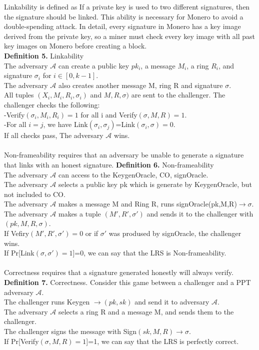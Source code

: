     
    Linkability is defined as If a private key is used to two different signatures, then the signature should be linked. This ability is necessary for Monero to avoid a double-spending attack. In detail, every signature in Monero has a key image derived from the private key, so a miner must check every key image with all past key images on Monero before creating a block.\\
    \textbf{Definition 5.} Linkability\\
    The adversary $\mathcal A $ can create a public key $pk_i$, a message $M_i$, a ring $R_i$, and signature $\sigma_i$ for $i \in [0,k-1]$.\\
    The adversary $\mathcal A $ also creates another message M, ring R and signature $\sigma $.\\
    All tuples $(X_i,M_i,R_i,\sigma_i)$ and $M,R,\sigma)$ are sent to the challenger.
    The challenger checks the following:\\
    -Verify$(\sigma_i,M_i,R_i)=1$ for all i and Verify$(\sigma,M,R)=1$.\\
    -For all $i=j$, we have Link$(\sigma_i,\sigma_j)$=Link$(\sigma_i,\sigma)=0$.\\
    If all checks pass, The adversary $\mathcal A $ wins.\\
    \\    
    Non-frameability requires that an adversary be unable to generate a signature that links with an honest signature.
    \textbf{Definition 6.} Non-frameability\\
    The adversary $\mathcal A $ can access to the KeygenOracle, CO, signOracle.\\
    The adversary $\mathcal A $ selects a public key pk which is generate by KeygenOracle, but not included to CO.\\
    The adversary $\mathcal A $ makes a message M and Ring R, runs signOracle(pk,M,R)$\rightarrow \sigma$.\\
    The adversary $\mathcal A $ makes a tuple $(M',R',\sigma ')$ and sends it to the challenger with $(pk,M,R,\sigma)$.\\
    If Vefiry$(M',R',\sigma ')=0$ or if $\sigma'$ was prodused by signOracle, the challenger wins.\\
    If Pr[Link$(\sigma, \sigma')=1$]=0, we can say that the LRS is Non-frameability.\\
    \\
    Correctness requires that a signature generated honestly will always verify.\\
    \textbf{Definition 7.} Correctness. Consider this game between a challenger and a PPT adversary $\mathcal A $.\\
    The challenger runs Keygen $\rightarrow (pk,sk)$ and send it to adversary $\mathcal A $.\\
    The adversary $\mathcal A $ selects a ring R and a message M, and sends them to the challenger.\\
    The challenger signs the message with Sign$(sk,M,R) \rightarrow \sigma$.\\
    If Pr[Verify$(\sigma,M,R)=1$]=1, we can say that the LRS is perfectly correct.\\
    
